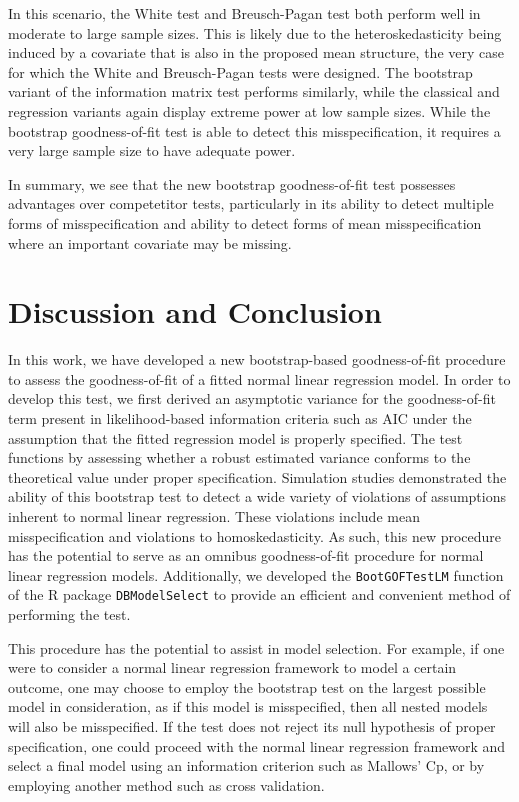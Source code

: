 \documentclass[submit]{smj}
\begin{document}
In this scenario, the White test and Breusch-Pagan test both perform well in moderate to large sample sizes. This is likely due to the heteroskedasticity being induced by a covariate that is also in the 
proposed mean structure, the very case for which the White and Breusch-Pagan tests were designed. The bootstrap variant of the information matrix test performs similarly, while the classical and regression
variants again display extreme power at low sample sizes. While the bootstrap goodness-of-fit test is able to detect this misspecification, it requires a very large sample size to have adequate power.

In summary, we see that the new bootstrap goodness-of-fit test possesses advantages over competetitor tests, particularly in its ability to detect multiple forms of misspecification and ability to detect
forms of mean misspecification where an important covariate may be missing.

\section{Discussion and Conclusion}

In this work, we have developed a new bootstrap-based goodness-of-fit procedure to assess the goodness-of-fit of a fitted normal linear regression model. In order
to develop this test, we first derived an asymptotic variance for the goodness-of-fit term present in likelihood-based information criteria such as AIC under the assumption
that the fitted regression model is properly specified. The test functions by assessing whether a robust estimated variance conforms to the
theoretical value under proper specification. Simulation studies demonstrated the ability of this bootstrap test to detect a wide variety of violations of assumptions inherent to
normal linear regression. These violations include mean misspecification and violations to homoskedasticity. As such, this new procedure has the potential to serve as an omnibus
goodness-of-fit procedure for normal linear regression models. Additionally, we developed the \texttt{BootGOFTestLM} function of the R package \texttt{DBModelSelect} to provide
an efficient and convenient method of performing the test.

This procedure has the potential to assist in model selection. For example, if one were to consider a normal linear regression framework to model a certain outcome, one may
choose to employ the bootstrap test on the largest possible model in consideration, as if this model is misspecified, then all nested models will also be misspecified.
If the test does not reject its null hypothesis of proper specification, one could proceed with the normal linear regression framework and select a final model using
an information criterion such as Mallows' Cp, or by employing another method such as cross validation.
\end{document}
